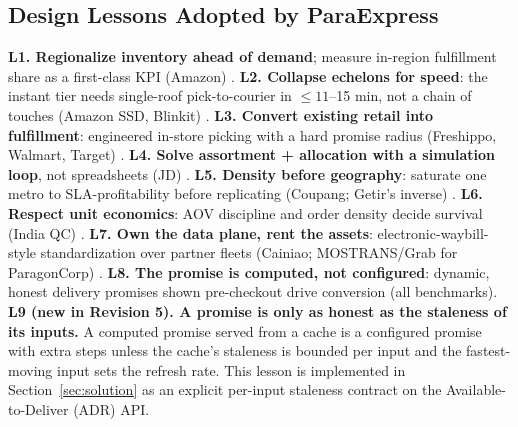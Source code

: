 \subsection{Design Lessons Adopted by ParaExpress}
\textbf{L1. Regionalize inventory ahead of demand}; measure in-region fulfillment share as a first-class KPI (Amazon) \cite{chandra2026}.
\textbf{L2. Collapse echelons for speed}: the instant tier needs single-roof pick-to-courier in $\leq 11$--15 min, not a chain of touches (Amazon SSD, Blinkit) \cite{costar2024,storyboard2025}.
\textbf{L3. Convert existing retail into fulfillment}: engineered in-store picking with a hard promise radius (Freshippo, Walmart, Target) \cite{vangaalen2022,scd2025,target2023}.
\textbf{L4. Solve assortment + allocation with a simulation loop}, not spreadsheets (JD) \cite{wang2025}.
\textbf{L5. Density before geography}: saturate one metro to SLA-profitability before replicating (Coupang; Getir's inverse) \cite{goodwater2021,browne2024}.
\textbf{L6. Respect unit economics}: AOV discipline and order density decide survival (India QC) \cite{mohan2025}.
\textbf{L7. Own the data plane, rent the assets}: electronic-waybill-style standardization over partner fleets (Cainiao; MOSTRANS/Grab for ParagonCorp) \cite{wirechina2024,grab2025}.
\textbf{L8. The promise is computed, not configured}: dynamic, honest delivery promises shown pre-checkout drive conversion (all benchmarks).
\textbf{L9 (new in Revision 5). A promise is only as honest as the staleness of its inputs.} A computed promise served from a cache is a configured promise with extra steps unless the cache's staleness is bounded per input and the fastest-moving input sets the refresh rate. This lesson is implemented in Section~\ref{sec:solution} as an explicit per-input staleness contract on the Available-to-Deliver (ADR) API.
